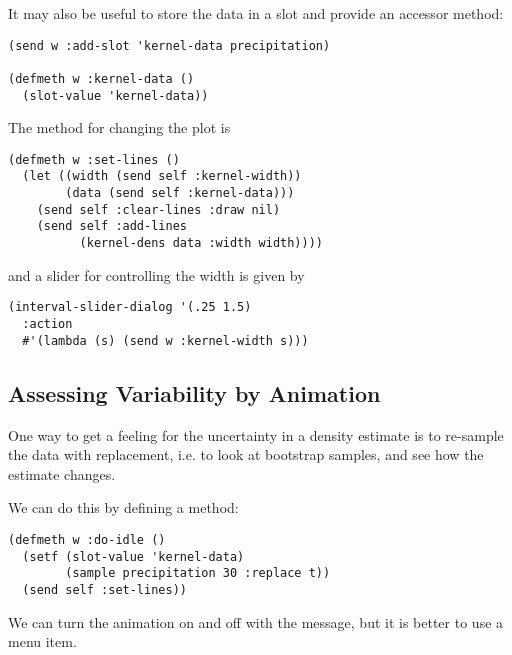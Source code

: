 \begin{slide}{}
It may also be useful to store the data in a slot and provide an accessor
method:
{\Large
\begin{verbatim}
(send w :add-slot 'kernel-data precipitation)

(defmeth w :kernel-data ()
  (slot-value 'kernel-data))
\end{verbatim}}

The method for changing the plot is
{\Large
\begin{verbatim}
(defmeth w :set-lines ()
  (let ((width (send self :kernel-width))
        (data (send self :kernel-data)))
    (send self :clear-lines :draw nil)
    (send self :add-lines
          (kernel-dens data :width width))))
\end{verbatim}}
and a slider for controlling the width is given by
{\Large
\begin{verbatim}
(interval-slider-dialog '(.25 1.5)
  :action 
  #'(lambda (s) (send w :kernel-width s)))
\end{verbatim}}
\end{slide}

\begin{slide}{}
\subsection{Assessing Variability by Animation}
One way to get a feeling for the uncertainty in a density estimate
is to re-sample the data with replacement, i.e. to look at bootstrap
samples, and see how the estimate changes.

We can do this by defining a  method:
{\Large
\begin{verbatim}
(defmeth w :do-idle ()
  (setf (slot-value 'kernel-data)
        (sample precipitation 30 :replace t))
  (send self :set-lines))
\end{verbatim}}
We can turn the animation on and off with the 
message, but it is better to use a menu item.

\end{slide}

